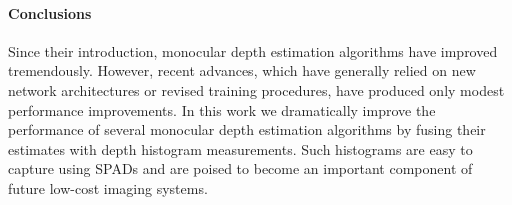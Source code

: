 \paragraph{Conclusions}
Since their introduction, monocular depth estimation algorithms have improved tremendously.  However, recent advances, which have generally relied on new network architectures or revised training procedures, have produced only modest performance improvements. 
In this work we dramatically improve the performance of several monocular depth estimation algorithms by fusing their estimates with depth histogram measurements. 
Such histograms are easy to capture using SPADs and are poised to become an important component of future low-cost imaging systems.
 
